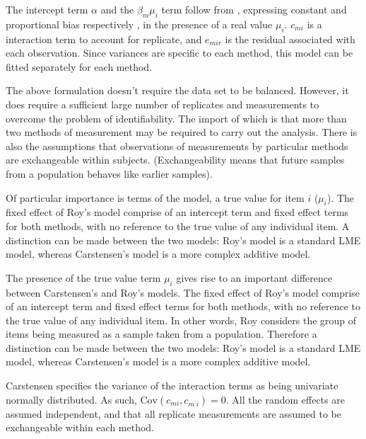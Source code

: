 \documentclass[12pt, a4paper]{report}
\theoremstyle{plain}
\theoremstyle{definition}
\theoremstyle{remark}
\begin{document}
The intercept term $\alpha$ and the $\beta_{m}\mu_{i}$ term follow from \cite{DunnSEME}, expressing constant and proportional bias respectively , in the presence of a real value $\mu_{i}.$ $c_{mi}$ is a interaction term to account for replicate, and $e_{mir}$ is the residual associated with each observation. Since variances are specific to each method, this model can be
fitted separately for each method.

The above formulation doesn't require the data set to be balanced. However, it does require a sufficient large number of replicates and measurements to overcome the problem of identifiability. The import of which is that more than two methods of measurement may be required to carry out the analysis. There is also the assumptions that observations of measurements by particular methods are exchangeable within subjects. (Exchangeability means
that future samples from a population behaves like earlier samples).

Of particular importance is terms of the model, a true value for item $i$ ($\mu_{i}$).  The fixed effect of Roy's model comprise of an intercept term and fixed effect terms for both methods, with no reference to the true value of any individual item. A distinction can be made between the two models: Roy's model is a standard LME model, whereas Carstensen's model is a more complex additive model.


The presence of the true value term $\mu_i$ gives rise to an important difference between Carstensen's and Roy's models. The fixed effect of Roy's model comprise of an intercept term and fixed effect terms for both methods, with no reference to the true value of any individual item. In other words, Roy considers the group of items being measured as a sample taken from a population. Therefore a distinction can be made between the two models: Roy's model is a standard LME model, whereas Carstensen's model is a more complex additive model.

Carstensen specifies the variance of the interaction terms as being univariate normally distributed. As such, $\mathrm{Cov}(c_{mi}, c_{m^\prime i})= 0.$ All the random effects are assumed independent, and that all replicate measurements are assumed to be exchangeable within each method.

\end{document}
